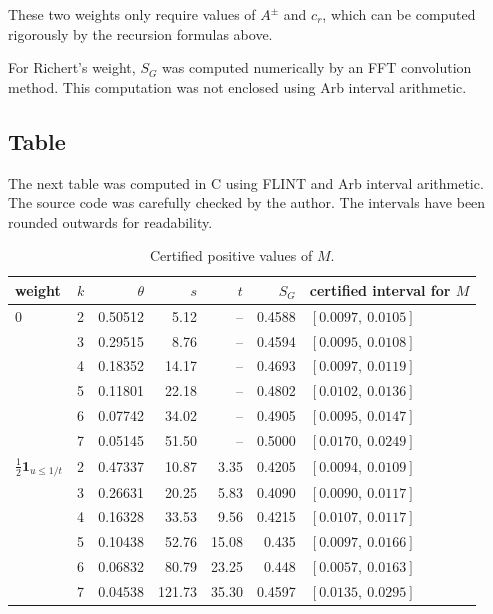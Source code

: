\documentclass{amsart}
\theoremstyle{definition}
\theoremstyle{remark}
\newcommand{\1}{
    \bm{1}
}
\begin{document}
These two weights only require values of \(A^\pm\) and \(c_r\), which can be computed rigorously by the recursion formulas above. 

For Richert's weight, \(S_G\) was computed numerically by an FFT convolution method. This computation was not enclosed using Arb interval arithmetic.


\subsection{Table}


The next table was computed in C using FLINT and Arb interval arithmetic. The source code was carefully checked by the author.
The intervals have been rounded outwards for readability.


\begin{table}[ht] 
\centering
\small
\setlength{\tabcolsep}{5pt}
\begin{tabular}{@{}llrrrrl@{}}
\toprule
weight & \(k\) & \(\theta\) & \(s\) & \(t\) & \(S_G\) & certified interval for \(M\)\\
\midrule
\(0\)
 & 2 & 0.50512 & 5.12  & --    & 0.4588 & \([0.0097,\ 0.0105]\)\\
 & 3 & 0.29515 & 8.76  & --    & 0.4594 & \([0.0095,\ 0.0108]\)\\
 & 4 & 0.18352 & 14.17 & --    & 0.4693 & \([0.0097,\ 0.0119]\)\\
 & 5 & 0.11801 & 22.18 & --    & 0.4802 & \([0.0102,\ 0.0136]\)\\
 & 6 & 0.07742 & 34.02 & --    & 0.4905 & \([0.0095,\ 0.0147]\)\\
 & 7 & 0.05145 & 51.50 & --    & 0.5000 & \([0.0170,\ 0.0249]\)\\
\addlinespace
\(\frac12\1_{u\le1/t}\)
 & 2 & 0.47337 & 10.87 & 3.35  & 0.4205 & \([0.0094,\ 0.0109]\)\\
 & 3 & 0.26631 & 20.25 & 5.83  & 0.4090 & \([0.0090,\ 0.0117]\)\\
 & 4 & 0.16328 & 33.53 & 9.56  & 0.4215 & \([0.0107,\ 0.0117]\)\\
 & 5 & 0.10438 & 52.76 & 15.08 & 0.435  & \([0.0097,\ 0.0166]\)\\
 & 6 & 0.06832 & 80.79 & 23.25 & 0.448  & \([0.0057,\ 0.0163]\)\\
 & 7 & 0.04538 & 121.73& 35.30 & 0.4597 & \([0.0135,\ 0.0295]\)\\
\bottomrule
\end{tabular}
\caption{Certified positive values of \(M\).}
\end{table}
\end{document}
